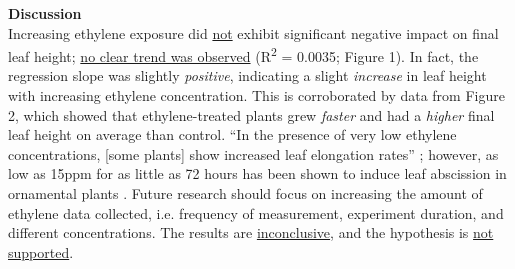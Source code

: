 \documentclass{report}
\begin{document}
\begin{multicols}{3}
  \textbf{Discussion}\\
  Increasing ethylene exposure did \uline{not} exhibit significant negative impact on final leaf height; \uline{no clear trend was observed} (R\textsuperscript{2} = 0.0035; Figure 1). In fact, the regression slope was slightly \textit{positive}, indicating a slight \textit{increase} in leaf height with increasing ethylene concentration. This is corroborated by data from Figure 2, which showed that ethylene-treated plants grew \textit{faster} and had a \textit{higher} final leaf height on average than control. ``In the presence of very low ethylene concentrations, [some plants] show increased leaf elongation rates'' \parencite{growth}; however, as low as 15ppm for as little as 72 hours has been shown to induce leaf abscission in ornamental plants \parencite{abscission}. Future research should focus on increasing the amount of ethylene data collected, i.e. frequency of measurement, experiment duration, and different concentrations. The results are \uline{inconclusive}, and the hypothesis is \uline{not supported}.
  
\end{multicols}

\clearpage


\printbibliography
\end{document}
